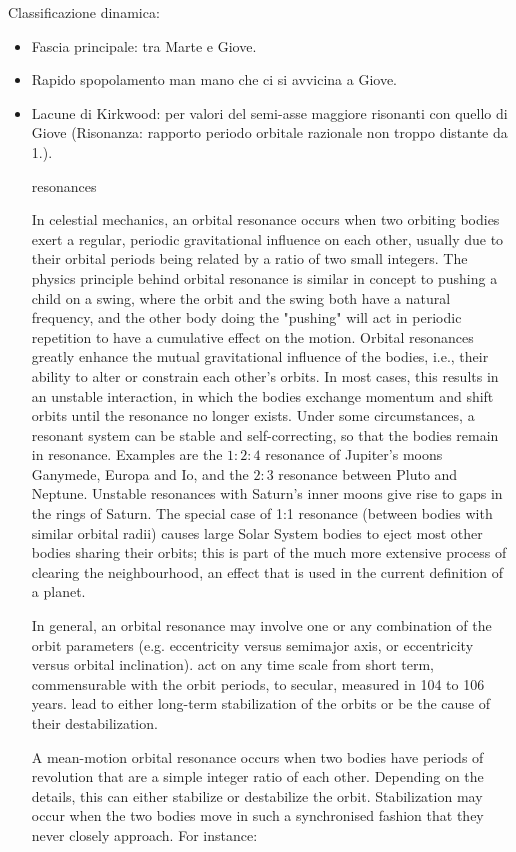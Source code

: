 Classificazione dinamica:
\begin{itemize}
    \item Fascia principale: tra Marte e Giove.
    \item Rapido spopolamento man mano che ci si avvicina a Giove.
    \item Lacune di Kirkwood: per valori del semi-asse maggiore risonanti con quello di Giove
    (Risonanza: rapporto periodo orbitale razionale non troppo distante da 1.).


\begin{frame}[allowframebreaks]{resonances}

In celestial mechanics, an orbital resonance occurs when two orbiting bodies exert a regular, periodic gravitational influence on each other, usually due to their orbital periods being related by a ratio of two small integers. The physics principle behind orbital resonance is similar in concept to pushing a child on a swing, where the orbit and the swing both have a natural frequency, and the other body doing the "pushing" will act in periodic repetition to have a cumulative effect on the motion. Orbital resonances greatly enhance the mutual gravitational influence of the bodies, i.e., their ability to alter or constrain each other's orbits. In most cases, this results in an unstable interaction, in which the bodies exchange momentum and shift orbits until the resonance no longer exists. Under some circumstances, a resonant system can be stable and self-correcting, so that the bodies remain in resonance. Examples are the $1:2:4$ resonance of Jupiter's moons Ganymede, Europa and Io, and the $2:3$ resonance between Pluto and Neptune. Unstable resonances with Saturn's inner moons give rise to gaps in the rings of Saturn. The special case of 1:1 resonance (between bodies with similar orbital radii) causes large Solar System bodies to eject most other bodies sharing their orbits; this is part of the much more extensive process of clearing the neighbourhood, an effect that is used in the current definition of a planet.

In general, an orbital resonance may involve one or any combination of the orbit parameters (e.g. eccentricity versus semimajor axis, or eccentricity versus orbital inclination).
    act on any time scale from short term, commensurable with the orbit periods, to secular, measured in 104 to 106 years.
    lead to either long-term stabilization of the orbits or be the cause of their destabilization.

A mean-motion orbital resonance occurs when two bodies have periods of revolution that are a simple integer ratio of each other. Depending on the details, this can either stabilize or destabilize the orbit. Stabilization may occur when the two bodies move in such a synchronised fashion that they never closely approach. For instance:


\end{frame}
\end{itemize}
